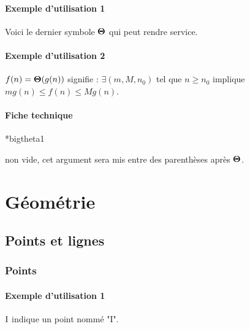 \documentclass[12pt,a4paper]{article}
\makeatletter
\theoremstyle{definition}
\newcommand\IDmacro{\@ifstar{\@IDmacro@star}{\@IDmacro@no@star}}
\newcommand\@IDmacro@no@star[3]{%
    \texttt{%
    	\textbackslash#1%
    	\IfStrEq{#2}{0}{}{%
    		\,\,[#2 Option%
				\IfStrEq{#2}{1}{}{s}]%
			}%
	    \IfStrEq{#3}{}{}{%
	    		\,\,(#3 Argument%
				\IfStrEq{#3}{1}{}{s})%
			}
	   	}
    \immediate\write\tempfile{macro,#1,#2,#3}%
}
\newcommand\@IDmacro@star[2]{%
    \@IDmacro@no@star{#1}{0}{#2}%
}
\newcommand\@IDoptarg{\@ifstar{\@IDoptarg@star}{\@IDoptarg@no@star}}
\newcommand\@IDoptarg@star[2]{%
	\vspace{0.5em}
	\textbf{---} \texttt{#1%
		\IfStrEq{#2}{}{:}{\,#2:}%
	}%
}
\newcommand\@IDoptarg@no@star[2]{%
	\IfStrEq{#2}{}{%
		\@IDoptarg@star{#1}{}%
	}{%
		\@IDoptarg@star{#1}{#2}%
	}%
}
\newcommand\IDarg[1]{%
	\@IDoptarg{Argument}{#1}%
}
\makeatother
\begin{document}
            \paragraph{Exemple d'utilisation 1}

\begin{tcblisting}{}
Voici le dernier symbole $\bigtheta{}$ qui peut rendre service.
\end{tcblisting}


            \paragraph{Exemple d'utilisation 2}

\begin{tcblisting}{}
$f(n) = \bigtheta{g(n)}$ signifie : $\exists (m, M, n_0)$ tel que $n \geqslant n_0$
implique $m g(n) \leqslant f(n) \leqslant M g(n)$.
\end{tcblisting}


            \paragraph{Fiche technique}

\IDmacro*{bigtheta}{1}

\IDarg{} non vide, cet argument sera mis entre des parenthèses après $\bigtheta{}$.




\section{Géométrie}

    \subsection{Points et lignes}

	    \subsubsection{Points}

            \paragraph{Exemple d'utilisation 1}

\begin{tcblisting}{}
$\pt{I}$ indique un point nommé "I".
\end{tcblisting}
\end{document}
